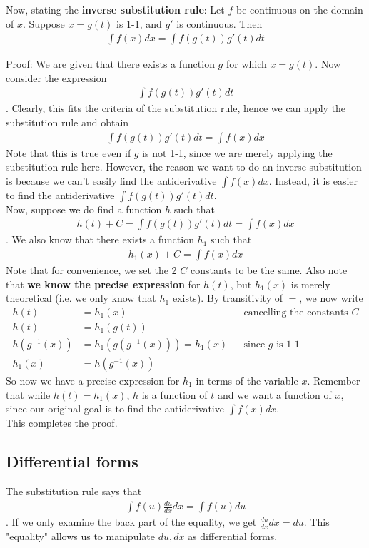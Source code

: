 \documentclass{article}
\begin{document}
Now, stating the \textbf{inverse substitution rule}:
Let $f$ be continuous on the domain of $x$. Suppose $x=g(t)$ is 1-1, and $g'$ is continuous. Then 
\begin{align*}
    \int f(x)dx = \int f(g(t))g'(t)dt
\end{align*}

Proof:
We are given that there exists a function $g$ for which $x=g(t)$. Now consider the expression
\begin{align*}
    \int f(g(t))g'(t)dt
\end{align*}
. Clearly, this fits the criteria of the substitution rule, hence we can apply the substitution rule and obtain
\begin{align*}
    \int f(g(t))g'(t)dt = \int f(x)dx
\end{align*}
Note that this is true even if $g$ is not 1-1, since we are merely applying the substitution rule here. However, the reason we want to do an inverse substitution is because we can't easily find the antiderivative $\int f(x)dx$. Instead, it is easier to find the antiderivative  $\int f(g(t))g'(t)dt$.\\
Now, suppose we do find a function $h$ such that 
\begin{align*}
    h(t) + C = \int f(g(t))g'(t)dt = \int f(x)dx
\end{align*}
. We also know that there exists a function $h_1$ such that 
\begin{align*}
    h_1(x) + C = \int f(x)dx
\end{align*}
Note that for convenience, we set the 2 $C$ constants to be the same. Also note that \textbf{we know the precise expression} for $h(t)$, but $h_1(x)$ is merely theoretical (i.e. we only know that $h_1$ exists).
By transitivity of $=$, we now write
\begin{align*}
    h(t)&=h_1(x) &&\text{cancelling the constants $C$}\\
    h(t)&=h_1(g(t))\\
    h(g^{-1}(x))&=h_1(g(g^{-1}(x)))=h_1(x) &&\text{since $g$ is 1-1}\\
    h_1(x) &= h(g^{-1}(x))
\end{align*}
So now we have a precise expression for $h_1$ in terms of the variable $x$. Remember that while $h(t)=h_1(x)$, $h$ is a function of $t$ and we want a function of $x$, since our original goal is to find the antiderivative $\int f(x)dx$.\\
This completes the proof.

\subsection{Differential forms}
The substitution rule says that \begin{align*}
    \int f(u)\frac{du}{dx} dx=\int f(u) du
\end{align*}.
If we only examine the back part of the equality, we get $\frac{du}{dx}dx=du$. This "equality" allows us to manipulate $du,dx$ as differential forms.
\end{document}
